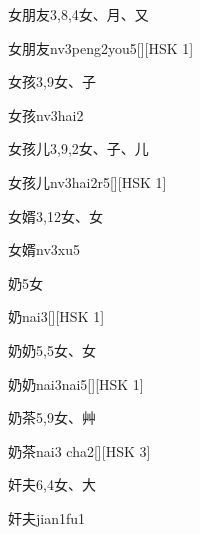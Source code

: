 \begin{entry}{女朋友}{3,8,4}{⼥、⽉、⼜}
  \begin{phonetics}{女朋友}{nv3peng2you5}[][HSK 1]
  \end{phonetics}
\end{entry}

\begin{entry}{女孩}{3,9}{⼥、⼦}
  \begin{phonetics}{女孩}{nv3hai2}
  \end{phonetics}
\end{entry}

\begin{entry}{女孩儿}{3,9,2}{⼥、⼦、⼉}
  \begin{phonetics}{女孩儿}{nv3hai2r5}[][HSK 1]
  \end{phonetics}
\end{entry}

\begin{entry}{女婿}{3,12}{⼥、⼥}
  \begin{phonetics}{女婿}{nv3xu5}
  \end{phonetics}
\end{entry}

\begin{entry}{奶}{5}{⼥}
  \begin{phonetics}{奶}{nai3}[][HSK 1]
  \end{phonetics}
\end{entry}

\begin{entry}{奶奶}{5,5}{⼥、⼥}
  \begin{phonetics}{奶奶}{nai3nai5}[][HSK 1]
  \end{phonetics}
\end{entry}

\begin{entry}{奶茶}{5,9}{⼥、⾋}
  \begin{phonetics}{奶茶}{nai3 cha2}[][HSK 3]
  \end{phonetics}
\end{entry}

\begin{entry}{奸夫}{6,4}{⼥、⼤}
  \begin{phonetics}{奸夫}{jian1fu1}
  \end{phonetics}
\end{entry}

